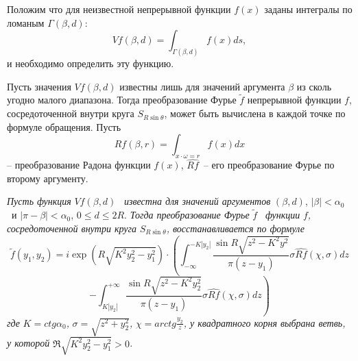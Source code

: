 Положим что для неизвестной непрерывной функции  $f(x)$ заданы интегралы по ломаным  $\Gamma \left(\beta ,d\right)$:
\begin{equation*}
\mathit{Vf}\left(\beta ,d\right)=\int _{\Gamma \left(\beta ,d\right)}^{}f(x)\mathit{ds},
\end{equation*}
и необходимо определить эту функцию.

Пусть значения $\mathit{Vf}\left(\beta ,d\right)$ известны лишь для значений
аргумента  $\beta $  из сколь угодно малого диапазона. 
Тогда преобразование Фурье $\tilde{f}$ непрерывной функции $f$, сосредоточенной внутри круга $S_{R\sin\theta}$, может быть вычислена в каждой точке по формуле обращения.
%
Пусть
\begin{equation*}
\mathit{Rf}\left(\beta ,r\right)=\int _{x{\cdot}\omega =r}^{}f(x)\mathit{dx}
\end{equation*}
-- преобразование Радона функции  $f(x)$,  $\widehat {\mathit{Rf}}$\ – его преобразование Фурье по второму аргументу.

\begin{theorem}
\textit{Пусть функция}  $\mathit{Vf}\left(\beta ,d\right)$ \ \textit{известна для значений
	аргументов}  $\left(\beta ,d\right)$, $\left|\beta \right|<\alpha _0$ \ и  $\left|\pi -\beta \right|<\alpha
_0$, $0{\leq}d{\leq}2R$. \textit{Тогда преобразование Фурье } $\widetilde f$ \textit{\ функции } $f$\textit{,
	сосредоточенной внутри круга } $S_{R\sin \theta }$\textit{, восстанавливается по формуле}
\begin{equation*}
\widetilde f\left(y_1,y_2\right)=i\exp \left(R\sqrt{K^2y_2^2-y_1^2}\right){\cdot}\left(\int_{-\infty}^{-K\left|y_2\right|}\frac{\sin R \sqrt{z^2-K^2y^2}}{\pi(z - y_1)}\sigma\widehat{Rf}(\chi, \sigma)dz\right.
\end{equation*}
\begin{equation*}
\left.-\int _{K\left|y_2^{}\right|}^{{+\infty}}\frac{\sin R\sqrt{z^2-K^2y_2^2}}{\pi \left(z-y_1\right)}\sigma \widehat
{\mathit{Rf}}\left(\chi ,\sigma \right)\mathit{dz}\right)
\end{equation*}
\textit{где } $K=\mathit{ctg}\alpha _0$\textit{, } $\sigma =\sqrt{z^2+y_2^2}$\textit{,} $\chi =\mathit{arctg}\frac{y_2}
z$\textit{, у квадратного корня выбрана ветвь, у которой } $\Re \sqrt{K^2y_2^2-y_1^2}>0$\textit{.} 
\end{theorem}
